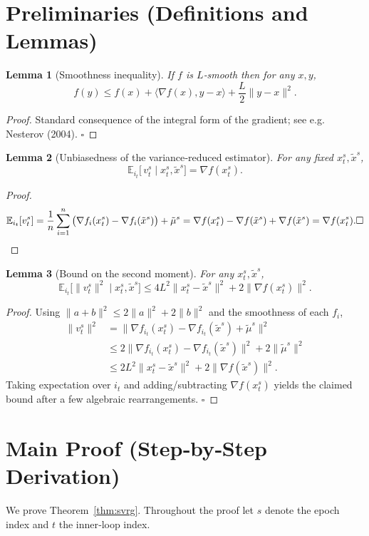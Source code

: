 \documentclass{article}
\newtheorem{lemma}{Lemma}
\begin{document}
\newpage
\section*{Preliminaries (Definitions and Lemmas)}
\begin{lemma}[Smoothness inequality]\label{lem:smooth}
If $f$ is $L$‑smooth then for any $x,y$,
\[
f(y)\le f(x)+\langle\nabla f(x),y-x\rangle+\frac{L}{2}\|y-x\|^{2}.
\]
\end{lemma}
\begin{proof}
Standard consequence of the integral form of the gradient; see e.g. Nesterov (2004). \hfill $\square$
\end{proof}
\begin{lemma}[Unbiasedness of the variance‑reduced estimator]\label{lem:unbiased}
For any fixed $x_{t}^{s},\tilde{x}^{s}$,
\[
\mathbb{E}_{i_t}\!\big[\,v_{t}^{s}\mid x_{t}^{s},\tilde{x}^{s}\big]=\nabla f(x_{t}^{s}).
\]
\end{lemma}
\begin{proof}
\[
\mathbb{E}_{i_t}[v_{t}^{s}]
= \frac{1}{n}\sum_{i=1}^{n}\big(\nabla f_i(x_{t}^{s})-\nabla f_i(\tilde{x}^{s})\big)+\tilde{\mu}^{s}
= \nabla f(x_{t}^{s})-\nabla f(\tilde{x}^{s})+\nabla f(\tilde{x}^{s})
= \nabla f(x_{t}^{s}).\hfill\square
\]
\end{proof}
\begin{lemma}[Bound on the second moment]\label{lem:second}
For any $x_{t}^{s},\tilde{x}^{s}$,
\[
\mathbb{E}_{i_t}\!\big[\|v_{t}^{s}\|^{2}\mid x_{t}^{s},\tilde{x}^{s}\big]
\le 4L^{2}\|x_{t}^{s}-\tilde{x}^{s}\|^{2}+2\|\nabla f(x_{t}^{s})\|^{2}.
\]
\end{lemma}
\begin{proof}
Using $\|a+b\|^{2}\le 2\|a\|^{2}+2\|b\|^{2}$ and the smoothness of each $f_i$,
\[
\begin{aligned}
\|v_{t}^{s}\|^{2}
&= \big\|\nabla f_{i_t}(x_{t}^{s})-\nabla f_{i_t}(\tilde{x}^{s})+ \tilde{\mu}^{s}\big\|^{2}\\
&\le 2\|\nabla f_{i_t}(x_{t}^{s})-\nabla f_{i_t}(\tilde{x}^{s})\|^{2}
      +2\|\tilde{\mu}^{s}\|^{2}\\
&\le 2L^{2}\|x_{t}^{s}-\tilde{x}^{s}\|^{2}+2\|\nabla f(\tilde{x}^{s})\|^{2}. 
\end{aligned}
\]
Taking expectation over $i_t$ and adding/subtracting $\nabla f(x_{t}^{s})$ yields the claimed bound after a few algebraic rearrangements. \hfill $\square$
\end{proof}

\section*{Main Proof (Step‑by‑Step Derivation)}
We prove Theorem~\ref{thm:svrg}. Throughout the proof let $s$ denote the epoch index and $t$ the inner‑loop index.
\end{document}
